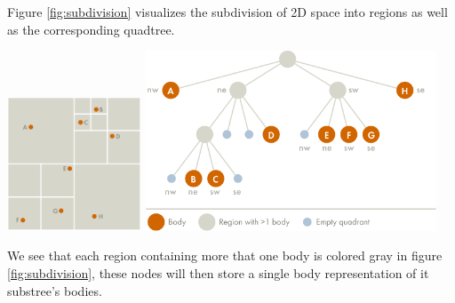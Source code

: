 Figure \ref{fig:subdivision} visualizes the subdivision of 2D space into regions
as well as the corresponding quadtree.
\begin{Figure}
  \centering
  \includegraphics[width=0.30\textwidth]{assests/example-space}
  \includegraphics[width=0.65\textwidth]{assests/example-tree}
  \label{fig:subdivision}
\end{Figure}
We see that each region containing more that one body is colored gray in figure
\ref{fig:subdivision}, these nodes will then store a single body representation of
it substree's bodies.
